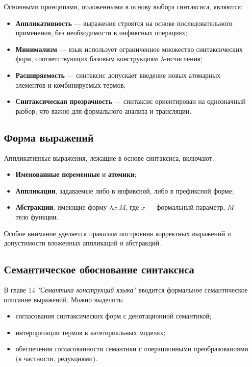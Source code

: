Основными принципами, положенными в основу выбора синтаксиса, являются:

\begin{itemize}
  \item \textbf{Аппликативность} — выражения строятся на основе последовательного применения, без необходимости в инфиксных операциях;
  \item \textbf{Минимализм} — язык использует ограниченное множество синтаксических форм, соответствующих базовым конструкциям $\lambda$-исчисления;
  \item \textbf{Расширяемость} — синтаксис допускает введение новых атомарных элементов и комбинируемых термов;
  \item \textbf{Синтаксическая прозрачность} — синтаксис ориентирован на однозначный разбор, что важно для формального анализа и трансляции.
\end{itemize}

\subsection*{Форма выражений}

Аппликативные выражения, лежащие в основе синтаксиса, включают:

\begin{itemize}
  \item \textbf{Именованные переменные} и \textbf{атомики};
  \item \textbf{Аппликации}, задаваемые либо в инфиксной, либо в префиксной форме;
  \item \textbf{Абстракции}, имеющие форму $\lambda x. M$, где $x$ — формальный параметр, $M$ — тело функции.
\end{itemize}

Особое внимание уделяется правилам построения корректных выражений и допустимости вложенных аппликаций и абстракций.

\subsection*{Семантическое обоснование синтаксиса}

В главе 14 \textit{"Семантика конструкций языка"} \cite{Wolfengagen2004} вводится формальное семантическое описание выражений. Можно выделить:

\begin{itemize}
  \item согласования синтаксических форм с денотационной семантикой;
  \item интерпретации термов в категориальных моделях;
  \item обеспечения согласованности семантики с операционными преобразованиями (в частности, редукциями).
\end{itemize}

